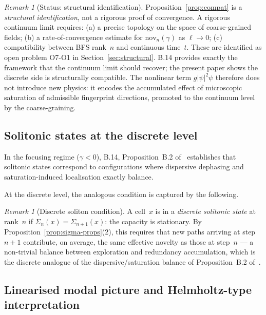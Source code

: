 \documentclass[11pt,a4paper]{article}
\theoremstyle{definition}
\theoremstyle{remark}
\newtheorem{remark}[theorem]{Remark}
\newcommand{\nov}{\mathrm{nov}}
\begin{document}
    \begin{remark}[Status: structural identification]
      \label{rem:compat-status}
      Proposition~\ref{prop:compat} is a \emph{structural identification}, not a rigorous
      proof of convergence.
      A rigorous continuum limit requires: (a) a precise topology on the space of coarse-grained
      fields; (b) a rate-of-convergence estimate for $\nov_n(\gamma)$ as $\ell \to 0$;
      (c) compatibility between BFS rank~$n$ and continuous time~$t$.
      These are identified as open problem O7-O1 in Section~\ref{sec:structural}.
      B.14 provides exactly the framework that the continuum limit should recover;
      the present paper shows the discrete side is structurally compatible.
      The nonlinear term $g|\psi|^2\psi$ therefore does not introduce new physics:
      it encodes the accumulated effect of microscopic saturation of admissible fingerprint
      directions, promoted to the continuum level by the coarse-graining.
    \end{remark}

  \subsection{Solitonic states at the discrete level}
    \label{ssec:solitons}

    In the focusing regime ($\gamma < 0$), B.14, Proposition~B.2 of~\cite{Cosmochrony}
    establishes that solitonic states correspond to configurations where dispersive dephasing
    and saturation-induced localisation exactly balance.

    At the discrete level, the analogous condition is captured by the following.

    \begin{remark}[Discrete soliton condition]
      \label{rem:soliton}
      A cell~$x$ is in a \emph{discrete solitonic state} at rank~$n$ if
      $\Sigma_n(x) = \Sigma_{n+1}(x)$: the capacity is stationary.
      By Proposition~\ref{prop:sigma-props}(2), this requires that new paths arriving at step $n+1$
      contribute, on average, the same effective novelty as those at step~$n$ --- a non-trivial
      balance between exploration and redundancy accumulation, which is the discrete analogue
      of the dispersive/saturation balance of Proposition~B.2 of~\cite{Cosmochrony}.
    \end{remark}

  \subsection{Linearised modal picture and Helmholtz-type interpretation}
    \label{ssec:helmholtz}
\end{document}
